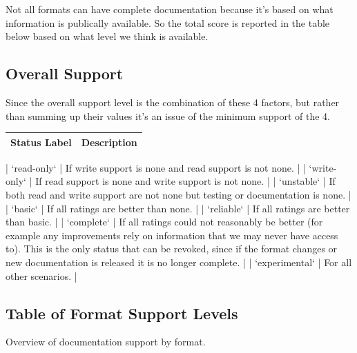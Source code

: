 \documentclass{report}
\begin{document}
Not all formats can have complete documentation because it's based on what 
information is publically available. So the total score is reported in the table
below based on what level we think is available.

\subsection{Overall Support}

Since the overall support level is the combination of these
4 factors, but rather than summing up their values it's an 
issue of the minimum support of the 4.

\begin{longtable}{l p{8cm}}
Status Label & Description \\
\hline
\end{longtable}

| `read-only` | If write support is none and read support is not none. |
| `write-only` | If read support is none and write support is not none. |
| `unstable` | If both read and write support are not none but testing or documentation is none. |
| `basic` | If all ratings are better than none. |
| `reliable` | If all ratings are better than basic. |
| `complete` | If all ratings could not reasonably be better (for example any improvements rely on information that we may never have access to). This is the only status that can be revoked, since if the format changes or new documentation is released it is no longer complete. |
| `experimental` | For all other scenarios. |

\subsection{Table of Format Support Levels}

Overview of documentation support by format.
\end{document}
